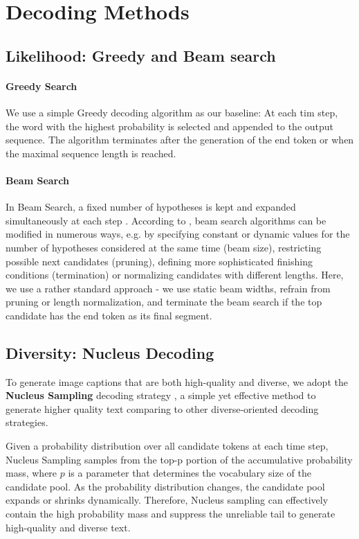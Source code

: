 \documentclass[11pt,a4paper]{article}
\begin{document}
\section{Decoding Methods}


\subsection{Likelihood: Greedy and Beam search}

\paragraph{Greedy Search} We use a simple Greedy decoding algorithm as our baseline: At each tim step, the word with the highest probability is selected and appended to the output sequence. The algorithm terminates after the generation of the end token or when the maximal sequence length is reached. %

\paragraph{Beam Search} In Beam Search, a fixed number of hypotheses is kept and expanded simultaneously at each step \citep[cf. e.g.][]{Graves2012}. According to \citet{zarriess-schlangen-2018-decoding}, beam search algorithms can be modified in numerous ways, e.g. by specifying constant or dynamic values for the number of hypotheses considered at the same time (beam size), restricting possible next candidates (pruning), defining more sophisticated finishing conditions (termination) or normalizing candidates with different lengths. Here, we use a rather standard approach - we use static beam widths, refrain from pruning or length normalization, and terminate the beam search if the top candidate has the end token as its final segment.

\subsection{Diversity: Nucleus Decoding}
To generate image captions that are both high-quality and diverse, we adopt the \textbf{Nucleus Sampling} decoding strategy \cite{Holtzman2019}, a simple yet effective method to generate higher quality text comparing to other diverse-oriented decoding strategies. 

Given a probability distribution over all candidate tokens at each time step, Nucleus Sampling samples from the top-p portion of the accumulative probability mass, where $p$ is a parameter that determines the vocabulary size of the candidate pool. As the probability distribution changes, the candidate pool expands or shrinks dynamically. Therefore, Nucleus sampling can effectively contain the high probability mass and suppress the unreliable tail to generate high-quality and diverse text. 
\end{document}
